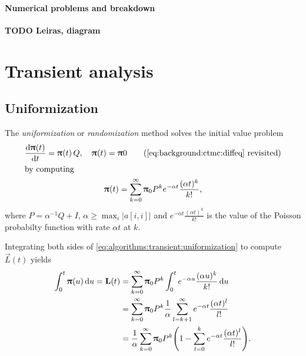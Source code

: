 \paragraph{Numerical problems and breakdown}

\textbf{TODO Leiras, diagram}

\section{Transient analysis}

\subsection{Uniformization}
\label{ssec:algorithms:uniformization}

The \emph{uniformization} or \emph{randomization} method solves the
initial value problem
\begin{gather}
  \frac{\dd \vec{\uppi}(t)}{\dd t} = \vec{\uppi}(t) \, Q, \quad
  \vec{\uppi}(t) = \vec{\uppi}{0}
  \tag{\ref{eq:background:ctmc:diffeq}~revisited}\\
  \shortintertext{by computing}
  \vec{\uppi}(t) = \sum_{k = 0}^{\infty} \vec{\uppi}_0 P^k e^{-\alpha
    t} \frac{(\alpha t)^k}{k!}\text,
  \label{eq:algorithms:transient:uniformization}
\end{gather}
where $P = \alpha^{-1} Q + I$,
$\alpha \ge \max_{i} \lvert a[i, i] \rvert$ and
$e^{-\alpha t} \frac{(\alpha t)^k}{k!}$ is the value of the Poisson
probabilty function with rate $\alpha t$ at $k$.

Integrating both sides of
\vref{eq:algorithms:transient:uniformization} to compute $\vec{L}(t)$
yields~\citep{reibman1989markov}
\begin{align}
  \int_{0}^t \vec{\uppi}(u) \,\dd u = \vec{L}(t)
  &= \sum_{k = 0}^{\infty} \vec{\uppi}_0 P^k \int_{0}^{t} e^{-\alpha
    u} \frac{(\alpha u)^k}{k!} \,\dd u \\
  &= \sum_{k = 0}^{\infty} \vec{\uppi}_0 P^k \frac{1}{\alpha} \sum_{l
    = k + 1}^{\infty} e^{-\alpha t} \frac{(\alpha t)^l}{l!} \\
  &= \frac{1}{\alpha} \sum_{k = 0}^{\infty} \vec{\uppi}_0 P^k \mleft(
    1 - \sum_{l = 0}^{k} e^{-\alpha t} \frac{(\alpha t)^l}{l!}
    \mright) \text.
    \label{eq:algorithms:transient:aggregate-uniformization}
\end{align}

